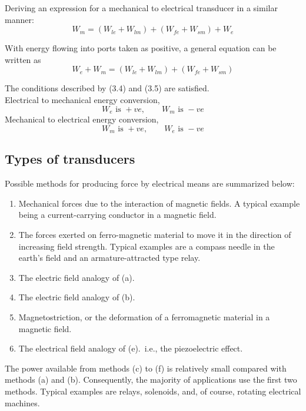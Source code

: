 \documentclass[a4paper,numbers=noenddot,12pt]{scrbook}
\begin{document}
Deriving an expression for a mechanical to electrical transducer in a similar manner:
\begin{equation}
    W_m = (W_{le} + W_{lm}) + (W_{fe} + W_{sm}) + W_e 
    \label{eq:Eq3.5}
\end{equation}

With energy flowing into ports taken as positive, a general equation can be written as
\begin{equation}
    W_e + W_m = (W_{le}+ W_{lm}) + (W_{fe} + W_{sm})
    \label{eq_Eq3.6}
\end{equation}

The conditions described by (3.4) and (3.5) are satisfied.\\ Electrical to mechanical energy conversion,
\begin{equation*}
    W_e \text{\ is }+ve,\qquad W_m \text{\ is } -ve
\end{equation*}
Mechanical to electrical energy conversion,
\begin{equation*}
    W_m \text{\ is }+ve,\qquad W_e \text{\ is } -ve
\end{equation*}

\subsection{Types of transducers}
Possible methods for producing force by electrical means are summarized below:
\begin{enumerate}
    \item Mechanical forces due to the interaction of magnetic fields. A typical example being a current-carrying conductor in a magnetic field.
    \item The forces exerted on ferro-magnetic material to move it in the direction of increasing field strength. Typical examples are a compass needle in the earth's field and an armature-attracted type relay.
    \item The electric field analogy of (a).
    \item The electric field analogy of (b).
    \item Magnetostriction, or the deformation of a ferromagnetic material in a magnetic field.
    \item The electrical field analogy of (e).\ i.e., the piezoelectric effect.
\end{enumerate}

The power available from methods (c) to (f) is relatively small compared with methods (a) and (b). Consequently, the majority of applications use the first two methods. Typical examples are relays, solenoids, and, of course, rotating electrical machines. 
\end{document}
